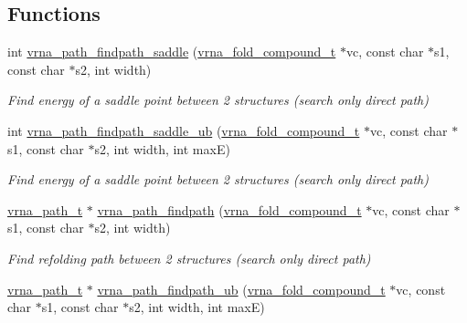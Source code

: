 \subsection*{Functions}
\begin{DoxyCompactItemize}
\item 
int \mbox{\hyperlink{group__direct__paths_gad611574a76593e26021f177e7854b6b4}{vrna\+\_\+path\+\_\+findpath\+\_\+saddle}} (\mbox{\hyperlink{group__fold__compound_ga1b0cef17fd40466cef5968eaeeff6166}{vrna\+\_\+fold\+\_\+compound\+\_\+t}} $\ast$vc, const char $\ast$s1, const char $\ast$s2, int width)
\begin{DoxyCompactList}\small\item\em Find energy of a saddle point between 2 structures (search only direct path) \end{DoxyCompactList}\item 
int \mbox{\hyperlink{group__direct__paths_gada8d722e37401b1aea30128b07555771}{vrna\+\_\+path\+\_\+findpath\+\_\+saddle\+\_\+ub}} (\mbox{\hyperlink{group__fold__compound_ga1b0cef17fd40466cef5968eaeeff6166}{vrna\+\_\+fold\+\_\+compound\+\_\+t}} $\ast$vc, const char $\ast$s1, const char $\ast$s2, int width, int maxE)
\begin{DoxyCompactList}\small\item\em Find energy of a saddle point between 2 structures (search only direct path) \end{DoxyCompactList}\item 
\mbox{\hyperlink{group__direct__paths_ga818d4f3d1cf8723d6905990b08d909fe}{vrna\+\_\+path\+\_\+t}} $\ast$ \mbox{\hyperlink{group__direct__paths_ga4b2283c4142cafd99678495585fcc842}{vrna\+\_\+path\+\_\+findpath}} (\mbox{\hyperlink{group__fold__compound_ga1b0cef17fd40466cef5968eaeeff6166}{vrna\+\_\+fold\+\_\+compound\+\_\+t}} $\ast$vc, const char $\ast$s1, const char $\ast$s2, int width)
\begin{DoxyCompactList}\small\item\em Find refolding path between 2 structures (search only direct path) \end{DoxyCompactList}\item 
\mbox{\hyperlink{group__direct__paths_ga818d4f3d1cf8723d6905990b08d909fe}{vrna\+\_\+path\+\_\+t}} $\ast$ \mbox{\hyperlink{group__direct__paths_ga8d47812616303f40057dfb033869863a}{vrna\+\_\+path\+\_\+findpath\+\_\+ub}} (\mbox{\hyperlink{group__fold__compound_ga1b0cef17fd40466cef5968eaeeff6166}{vrna\+\_\+fold\+\_\+compound\+\_\+t}} $\ast$vc, const char $\ast$s1, const char $\ast$s2, int width, int maxE)

\end{DoxyCompactItemize}
